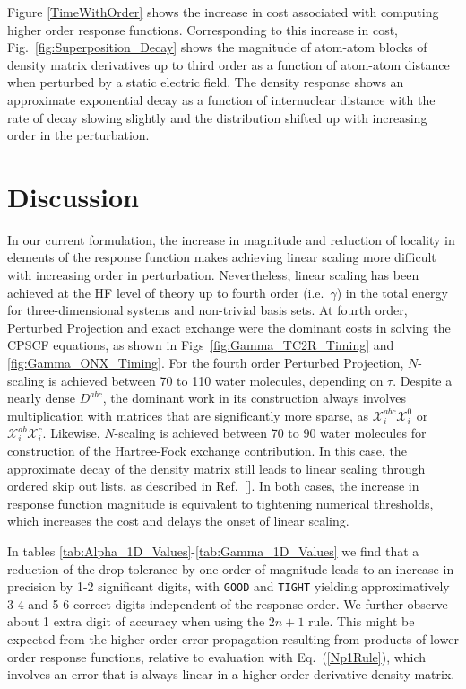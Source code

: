 \documentclass[prl,aps,preprint,showpacs,superbib]{revtex4}
\def\X{\mathcal{X}}
\begin{document}
Figure \ref{TimeWithOrder} shows the increase in cost associated with computing  higher order response functions.
Corresponding to this increase in cost, Fig.~\ref{fig:Superposition_Decay} shows the magnitude of atom-atom blocks 
of density matrix derivatives up to third order as a function of atom-atom distance 
when perturbed by a static electric field.  The density response shows an approximate 
exponential decay as a function of internuclear distance with the rate of  decay
slowing slightly and the distribution shifted up with increasing order in the perturbation.

\section{Discussion}

In our current formulation, the increase in magnitude and reduction of locality in elements of the 
response function makes achieving linear scaling more difficult with increasing order in perturbation. 
Nevertheless, linear scaling has been achieved at the HF level of theory up to fourth order (i.e.~$\gamma$) 
in the total energy for three-dimensional systems and  non-trivial basis sets.  At fourth order,
Perturbed Projection and exact exchange were the dominant costs in solving the CPSCF equations,
as shown in Figs~\ref{fig:Gamma_TC2R_Timing} and \ref{fig:Gamma_ONX_Timing}.  For the fourth order Perturbed Projection, 
$N$-scaling is achieved 
between 70 to 110 water molecules, depending on $\tau$.  Despite a nearly dense $D^{abc}$, the 
dominant work in its construction always involves multiplication with matrices that are significantly 
more sparse, as $\X^{abc}_i\X^{0}_i$ or $\X^{ab}_i\X^{c}_i$.   Likewise, $N$-scaling is achieved between 
70 to 90 water molecules for construction of the Hartree-Fock exchange contribution.  In this case, 
the approximate decay of the density matrix still leads to linear scaling through ordered skip out lists,
as described in Ref.~[].  In both cases, the increase in response function magnitude
is equivalent to tightening numerical thresholds, which increases the cost and delays the onset of linear
scaling. 

In tables \ref{tab:Alpha_1D_Values}-\ref{tab:Gamma_1D_Values} we find that 
a reduction of the drop tolerance by one order of magnitude leads to an increase in precision by
1-2 significant digits, with {\tt GOOD} and {\tt TIGHT} yielding approximatively 3-4 and 5-6 
correct digits  independent of the response order.  We further observe about 1 extra digit of accuracy 
when using the $2n+1$ rule.  This might be expected from the higher order error propagation resulting from 
products of lower order response functions, relative to evaluation with  Eq.~(\ref{Np1Rule}), 
which involves an error that is always linear in a higher order derivative density matrix.  
\end{document}

